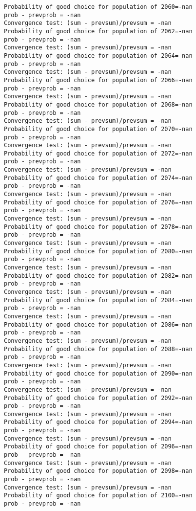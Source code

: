 \documentclass[11pt,onecolumn]{article}
\begin{document}
\begin{verbatim}
Probability of good choice for population of 2060=-nan
prob - prevprob = -nan
Convergence test: (sum - prevsum)/prevsum = -nan
Probability of good choice for population of 2062=-nan
prob - prevprob = -nan
Convergence test: (sum - prevsum)/prevsum = -nan
Probability of good choice for population of 2064=-nan
prob - prevprob = -nan
Convergence test: (sum - prevsum)/prevsum = -nan
Probability of good choice for population of 2066=-nan
prob - prevprob = -nan
Convergence test: (sum - prevsum)/prevsum = -nan
Probability of good choice for population of 2068=-nan
prob - prevprob = -nan
Convergence test: (sum - prevsum)/prevsum = -nan
Probability of good choice for population of 2070=-nan
prob - prevprob = -nan
Convergence test: (sum - prevsum)/prevsum = -nan
Probability of good choice for population of 2072=-nan
prob - prevprob = -nan
Convergence test: (sum - prevsum)/prevsum = -nan
Probability of good choice for population of 2074=-nan
prob - prevprob = -nan
Convergence test: (sum - prevsum)/prevsum = -nan
Probability of good choice for population of 2076=-nan
prob - prevprob = -nan
Convergence test: (sum - prevsum)/prevsum = -nan
Probability of good choice for population of 2078=-nan
prob - prevprob = -nan
Convergence test: (sum - prevsum)/prevsum = -nan
Probability of good choice for population of 2080=-nan
prob - prevprob = -nan
Convergence test: (sum - prevsum)/prevsum = -nan
Probability of good choice for population of 2082=-nan
prob - prevprob = -nan
Convergence test: (sum - prevsum)/prevsum = -nan
Probability of good choice for population of 2084=-nan
prob - prevprob = -nan
Convergence test: (sum - prevsum)/prevsum = -nan
Probability of good choice for population of 2086=-nan
prob - prevprob = -nan
Convergence test: (sum - prevsum)/prevsum = -nan
Probability of good choice for population of 2088=-nan
prob - prevprob = -nan
Convergence test: (sum - prevsum)/prevsum = -nan
Probability of good choice for population of 2090=-nan
prob - prevprob = -nan
Convergence test: (sum - prevsum)/prevsum = -nan
Probability of good choice for population of 2092=-nan
prob - prevprob = -nan
Convergence test: (sum - prevsum)/prevsum = -nan
Probability of good choice for population of 2094=-nan
prob - prevprob = -nan
Convergence test: (sum - prevsum)/prevsum = -nan
Probability of good choice for population of 2096=-nan
prob - prevprob = -nan
Convergence test: (sum - prevsum)/prevsum = -nan
Probability of good choice for population of 2098=-nan
prob - prevprob = -nan
Convergence test: (sum - prevsum)/prevsum = -nan
Probability of good choice for population of 2100=-nan
prob - prevprob = -nan

\end{verbatim}
\end{document}
